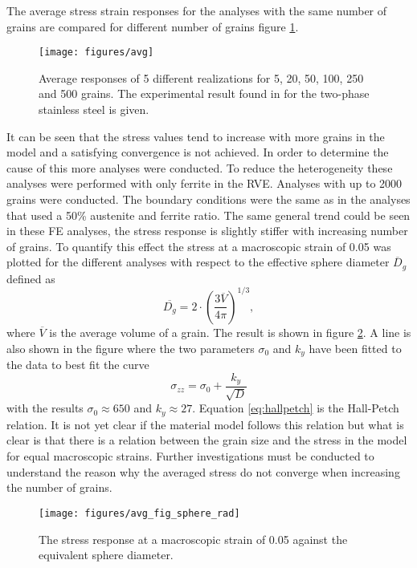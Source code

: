 \documentclass[crystal_plast.tex]{subfiles}
\begin{document}
The average stress strain responses for the analyses with the same number of grains are compared for different number of grains figure \ref{fig:avg}.
\begin{figure}[htpb!]
\centering
\texttt{[image: figures/avg]}
\caption{Average responses of 5 different realizations for 5, 20, 50, 100, 250 and 500 grains. The experimental result found in \cite{lillekh} for the two-phase stainless steel is given.}
\label{fig:avg}
\end{figure}
It can be seen that the stress values tend to increase with more grains in the model and a satisfying convergence is not achieved. In order to determine the cause of this more analyses were conducted. To reduce the heterogeneity these analyses were performed with only ferrite in the RVE. Analyses with up to 2000 grains were conducted. The boundary conditions were the same as in the analyses that used a 50\% austenite and ferrite ratio. The same general trend could be seen in these FE analyses, the stress response is slightly stiffer with increasing number of grains. To quantify this effect the stress at a macroscopic strain of 0.05 was plotted for the different analyses with respect to the effective sphere diameter $\overline{D}_g$ defined as
\begin{equation}
 \overline{D_g} = 2\cdot\left( \frac{ 3\overline{V}}{4 \pi} \right)^{1/3},
\end{equation}
where $\overline{V}$ is the average volume of a grain. The result is shown in figure \ref{fig:avg_sphere_rad}. A line is also shown in the figure where the two parameters $\sigma_0$ and $k_y$ have been fitted to the data to best fit the curve
%
\begin{equation}
\label{eq:hallpetch}
 \sigma_{zz} = \sigma_0 + \frac{k_y}{\sqrt{D}}
\end{equation}
with the results $\sigma_0 \approx 650$ and $k_y \approx 27$. Equation \ref{eq:hallpetch} is the Hall-Petch relation. It is not yet clear if the material model follows this relation but what is clear is that there is a relation between the grain size and the stress in the model for equal macroscopic strains. Further investigations must be conducted to understand the reason why the averaged stress do not converge when increasing the number of grains.


\begin{figure}[htpb!]
\centering
\texttt{[image: figures/avg\_fig\_sphere\_rad]}
\caption{The stress response at a macroscopic strain of 0.05 against the equivalent sphere diameter.}
\label{fig:avg_sphere_rad}
\end{figure}
\end{document}
